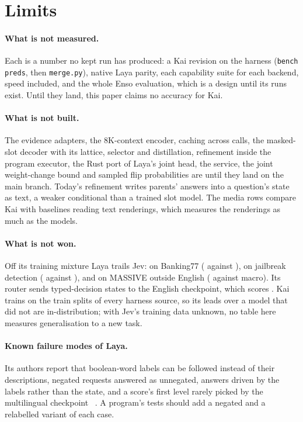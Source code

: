 \section{Limits}
\label{sec:limits}

\paragraph{What is not measured.}
Each \ph{} is a number no kept run has produced: a Kai revision on
the harness (\texttt{bench preds}, then \texttt{merge.py}), native Laya
parity, each capability suite for each backend, speed included, and the whole
Enso evaluation, which is a design until its runs exist. Until they land, this paper claims no
accuracy for Kai.

\paragraph{What is not built.}
The evidence adapters, the 8K-context encoder, caching across calls, the
masked-slot decoder with its lattice, selector and distillation, refinement
inside the program executor, the Rust port of Laya's joint head, the
 service, the joint weight-change bound and sampled flip
probabilities are \proposed{} until they land on the main branch. Today's refinement writes
parents' answers into a question's state as text, a weaker conditional than a
trained slot model. The media rows compare Kai with baselines reading text
renderings, which measures the renderings as much as the models.

\paragraph{What is not won.}
Off its training mixture Laya trails Jev: on Banking77 ( against
), on jailbreak detection
( against
), and on MASSIVE outside English
( against
 macro). Its router sends typed-decision
states to the English checkpoint, which scores
. Kai trains on the train splits of every
harness source, so its leads over a model that did not are in-distribution;
with Jev's training data unknown, no table here measures generalisation to a
new task.

\paragraph{Known failure modes of Laya.}
Its authors report that boolean-word labels can be followed instead of their
descriptions, negated requests answered as unnegated,  answers driven
by the labels rather than the state, and a score's first level rarely picked
by the multilingual checkpoint~\cite{laya} \reported. A program's tests should
add a negated and a relabelled variant of each case.

